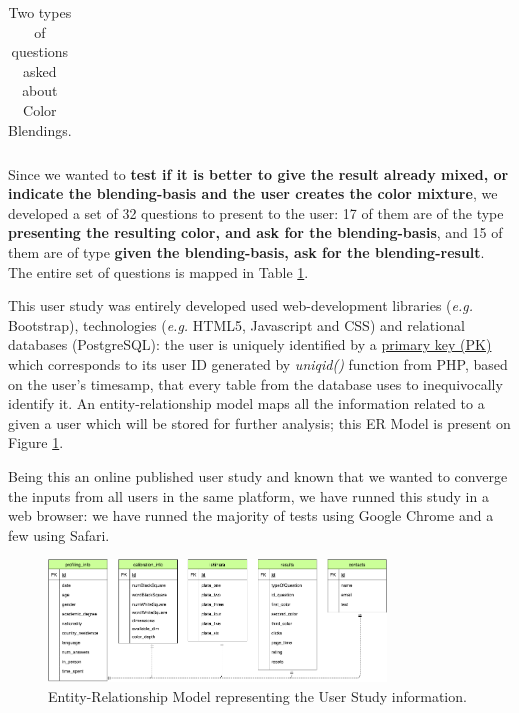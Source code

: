 \begin{table}[htbp]
{\begin{tabular}{ccc|c|ccccc}
	\end{tabular}}
  \caption[Two types of questions asked about Color Blendings.]{Two types of questions asked about Color Blendings.}
  \label{table:color_blendings}
\end{table}
%
Since we wanted to \textbf{test if it is better to give the result already mixed, or indicate the blending-basis and the user creates
the color mixture}, we developed a set of 32 questions to present to the user: 17 of them are of the type \textbf{presenting the resulting
color, and ask for the blending-basis}, and 15 of them are of type \textbf{given the blending-basis, ask for the blending-result}. The entire
set of questions is mapped in Table \ref{table:color_blendings}. \par
%
This user study was entirely developed used web-development libraries (\emph{e.g.} Bootstrap), technologies (\emph{e.g.} HTML5, Javascript
and CSS) and relational databases (PostgreSQL): the user is uniquely identified by a \ul{primary key (PK)} which corresponds to its user ID generated
by \emph{uniqid()} function from PHP, based on the user's timesamp, that every table from the database uses to inequivocally identify it.
An entity-relationship model maps all the information related to a given a user which will be stored for further analysis; this ER Model is present on
Figure \ref{fig:er_model}. \par
%
Being this an online published user study and known that we wanted to converge the inputs from all users in the same platform, we have runned this study
in a web browser: we have runned the majority of tests using Google Chrome and a few using Safari.
%
\begin{figure}[htbp]
	\centering
  \includegraphics[width=0.8\textwidth]{images/implementation/tables_schema.png}
  \caption[Entity-Relationship Model representing the User Study information.]{Entity-Relationship Model representing the User Study information.}
  \label{fig:er_model}
\end{figure}
%
%
